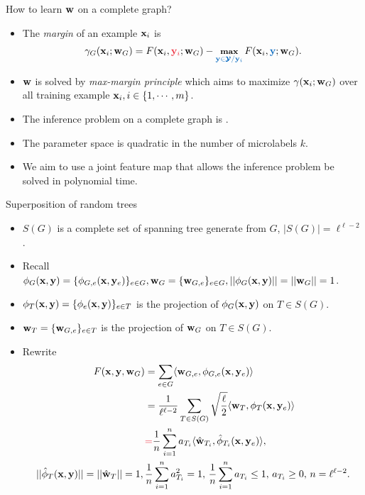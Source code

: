 \documentclass[first=dgreen,second=purple,logo=yellowexc]{aaltoslides}
\begin{document}
%
\begin{frame}{How to learn $\mathbf {w}$ on a complete graph?}
	\begin{itemize}\footnotesize
		\item The \textit{margin} of an example $\mathbf {x}_i$ is
		\begin{align*}\footnotesize
			\gamma_G(\vx_i;\vw_G) = F(\vx_i,{\color{aaltored} \vy_i};\vw_G) - \underset{{\color{aaltoblue}\vy\in\vYcal/\vy_i}}{\maximize}\,F(\vx_i,{\color{aaltoblue}\vy};\vw_G).
		\end{align*}
		\item $\mathbf {w}$ is solved by \textit{max-margin principle} which aims to maximize $\gamma(\mathbf {x}_i;\mathbf {w}_G)$ over all training example $\mathbf {x}_i,i\in\{1,\cdots,m\}$.
		\item The inference problem on a complete graph is \nphardness.
		\item The parameter space is quadratic in the number of microlabels $k$.
		\item We aim to use a joint feature map that allows the inference problem be solved in polynomial time.
	\end{itemize}
\end{frame}



%
\begin{frame}{Superposition of random trees}
	\begin{itemize}\footnotesize
		\item $S(G)$ is a complete set of spanning tree generate from $G$, $|S(G)| = \ell^{\ell-2}$.
		\item Recall $\phi_G(\mathbf {x},\mathbf {y}) = \{\phi_{G,e}(\mathbf {x},\mathbf {y}_e)\}_{e\in G},\mathbf {w}_G = \{\mathbf {w}_{G,e}\}_{e\in G},||\phi_G(\mathbf {x},\mathbf {y})||=||\mathbf {w}_{G}||=1$.
		\item $\phi_T(\mathbf {x},\mathbf {y})=\{\phi_e(\mathbf {x},\mathbf {y})\}_{e\in T}$ is the projection of $\phi_G(\mathbf {x},\mathbf {y})$ on $T\in S(G)$.
		\item $\mathbf {w}_{T}=\{\mathbf {w}_{G,e}\}_{e\in T}$ is the projection of $\mathbf {w}_G$ on $T\in S(G)$.
		\item Rewrite
		\begin{align*}\footnotesize
			F(\vx,\vy,\vw_G) &= \sum_{e\in G}\ip{\vw_{G,e}}{\phi_{G,e}(\vx,\vy_e)} \\
			& = \frac{1}{\ell^{\ell-2}}\sum_{T\in S(G)}\sqrt{\frac{\ell}{2}}\ip{\vw_{T}}{\phi_{T}(\vx,\vy_e)}\\
			& {\color{aaltored} =} \frac{1}{n}\sum_{i = 1}^{n}a_{T_i}\ip{\hat{\vw}_{T_i}}{\hat{\phi}_{T_i}(\vx,\vy_e)},\\
			||\hat{\phi}_T(\vx,\vy)||=||\hat{\vw}_{T}||=1,\, & \frac{1}{n}\sum_{i = 1}^{n}a_{T_i}^2=1, \, \frac{1}{n}\sum_{i = 1}^{n}a_{T_i}\le1,\, a_{T_i}\ge0,\, n=\ell^{\ell-2}.
		\end{align*}
	\end{itemize}
\end{frame}
\end{document}
